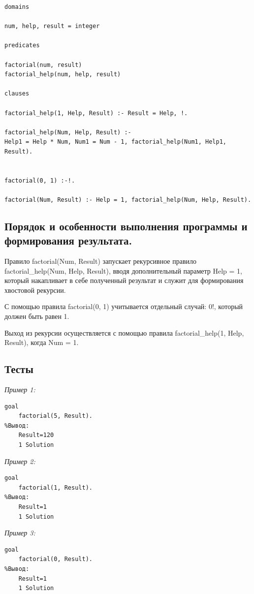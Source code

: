 \documentclass[a4paper,12pt]{article}
\begin{document}
	\begin{verbatim}
domains

num, help, result = integer

predicates

factorial(num, result)
factorial_help(num, help, result)

clauses

factorial_help(1, Help, Result) :- Result = Help, !.

factorial_help(Num, Help, Result) :- 
Help1 = Help * Num, Num1 = Num - 1, factorial_help(Num1, Help1, Result).


factorial(0, 1) :-!.

factorial(Num, Result) :- Help = 1, factorial_help(Num, Help, Result).
	\end{verbatim}
	
	\subsection*{Порядок и особенности выполнения программы и формирования результата.}
	
	Правило factorial(Num, Result) запускает рекурсивное правило factorial\_help(Num, Help, Result), вводя дополнительный параметр Help = 1, который накапливает в себе полученный результат и служит для формирования хвостовой рекурсии.
	
	С помощью правила factorial(0, 1) учитывается отдельный случай: 0!, который должен быть равен 1.
	
	Выход из рекурсии осуществляется с помощью правила factorial\_help(1, Help, Result), когда Num = 1.
	
	\subsection*{Тесты}
	
	\textit{Пример 1:}
	
	\begin{verbatim}
goal
	factorial(5, Result).
%Вывод:
	Result=120
	1 Solution
	\end{verbatim}
	
	\textit{Пример 2:}
	
	\begin{verbatim}
goal
	factorial(1, Result).
%Вывод:
	Result=1
	1 Solution
	\end{verbatim}
	
	\textit{Пример 3:}
	
	\begin{verbatim}
goal
	factorial(0, Result).
%Вывод:
	Result=1
	1 Solution
	\end{verbatim}
	
\end{document}

